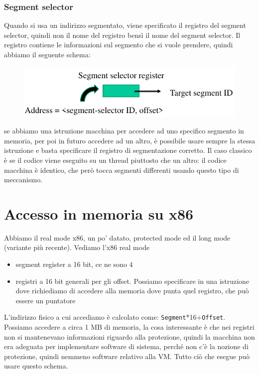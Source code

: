 \documentclass[12pt, oneside]{extbook}
\begin{document}
\subsubsection{Segment selector}
Quando si usa un indirizzo segmentato, viene specificato il registro del segment selector, quindi non il nome del registro bensì il nome del segment selector. Il registro contiene le informazioni sul segmento che si vuole prendere, quindi abbiamo il seguente schema:
\begin{figure}[!h]
	\includegraphics[scale=0.3]{immagini/seg_sel.png}
\end{figure}
se abbiamo una istruzione macchina per accedere ad uno specifico segmento in memoria, per poi in futuro accedere ad un altro, è possibile usare sempre la stessa istruzione e basta specificare il registro di segmentazione corretto. Il caso classico è se il codice viene eseguito su un thread piuttosto che un altro: il codice macchina è identico, che però tocca segmenti differenti usando questo tipo di meccanismo.
\section{Accesso in memoria su x86}
Abbiamo il real mode x86, un po' datato, protected mode ed il long mode (variante più recente). Vediamo l'x86 real mode 
\begin{itemize}
\item segment register a 16 bit, ce ne sono 4
\item registri a 16 bit generali per gli offset. Possiamo specificare in una istruzione dove richiediamo di accedere alla memoria dove punta quel registro, che può essere un puntatore
\end{itemize}
L'indirizzo fisico a cui accediamo è calcolato come: \texttt{Segment}*16+\texttt{Offset}. Possiamo accedere a circa 1 MB di memoria, la cosa interessante è che nei registri non si mantenevano informazioni riguardo alla protezione, quindi la macchina non era adeguata per implementare software di sistema, perché non c'è la nozione di protezione, quindi nemmeno software relativo alla VM. Tutto ciò che esegue può usare questo schema.
\end{document}
